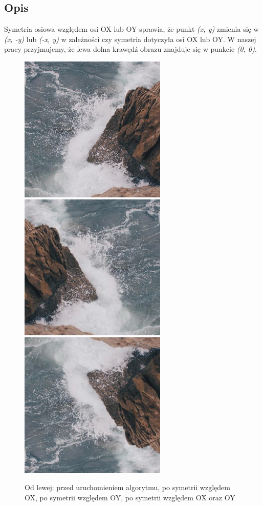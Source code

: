 \documentclass[a4paper,12pt]{book}
\begin{document}
\subsection*{Opis}
Symetria osiowa względem osi OX lub OY sprawia, że punkt \textit{(x, y)} zmienia się w \textit{(x, -y)} lub \textit{(-x, y)} w zależności czy symetria dotyczyła osi OX lub OY. W naszej pracy przyjmujemy, że lewa dolna krawędź obrazu znajduje się w punkcie \textit{(0, 0)}. 
\begin{figure}[H]
	\caption{Od lewej: przed uruchomieniem algorytmu, po symetrii względem OX, po symetrii względem OY, po symetrii względem OX oraz OY}
	\includegraphics[width=7cm, height=7cm]{sea-unmodified.jpg}
	\includegraphics[width=7cm, height=7cm]{sea-symmetry-x.png}
	\includegraphics[width=7cm, height=7cm]{sea-symmetry-y.png}

\end{figure}
\end{document}
